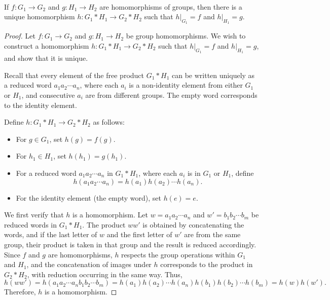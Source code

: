 \documentclass{article}
\begin{document}
\begin{problem}[1.9.15] \\ 
    If $f : G_1 \to G_2$ and $g : H_1 \to H_2$ are homomorphisms of groups, then there is a unique homomorphism $h : G_1 * H_1 \to G_2 * H_2$ such that $h|_{G_1} = f$ and $h|_{H_1} = g$.
\end{problem}



\begin{proof}
    Let $f : G_1 \to G_2$ and $g : H_1 \to H_2$ be group homomorphisms. We wish to construct a homomorphism $h : G_1 * H_1 \to G_2 * H_2$ such that $h|_{G_1} = f$ and $h|_{H_1} = g$, and show that it is unique.

    Recall that every element of the free product $G_1 * H_1$ can be written uniquely as a reduced word $a_1 a_2 \cdots a_n$, where each $a_i$ is a non-identity element from either $G_1$ or $H_1$, and consecutive $a_i$ are from different groups. The empty word corresponds to the identity element.

    Define $h : G_1 * H_1 \to G_2 * H_2$ as follows:
    \begin{itemize}
        \item For $g \in G_1$, set $h(g) = f(g)$.
        \item For $h_1 \in H_1$, set $h(h_1) = g(h_1)$.
        \item For a reduced word $a_1 a_2 \cdots a_n$ in $G_1 * H_1$, where each $a_i$ is in $G_1$ or $H_1$, define
        \[
            h(a_1 a_2 \cdots a_n) = h(a_1) h(a_2) \cdots h(a_n).
        \]
        \item For the identity element (the empty word), set $h(e) = e$.
    \end{itemize}

    We first verify that $h$ is a homomorphism. Let $w = a_1 a_2 \cdots a_n$ and $w' = b_1 b_2 \cdots b_m$ be reduced words in $G_1 * H_1$. The product $ww'$ is obtained by concatenating the words, and if the last letter of $w$ and the first letter of $w'$ are from the same group, their product is taken in that group and the result is reduced accordingly. Since $f$ and $g$ are homomorphisms, $h$ respects the group operations within $G_1$ and $H_1$, and the concatenation of images under $h$ corresponds to the product in $G_2 * H_2$, with reduction occurring in the same way. Thus,
    \[
        h(ww') = h(a_1 a_2 \cdots a_n b_1 b_2 \cdots b_m) = h(a_1) h(a_2) \cdots h(a_n) h(b_1) h(b_2) \cdots h(b_m) = h(w) h(w').
    \]
    Therefore, $h$ is a homomorphism.


\end{proof}
\end{document}
